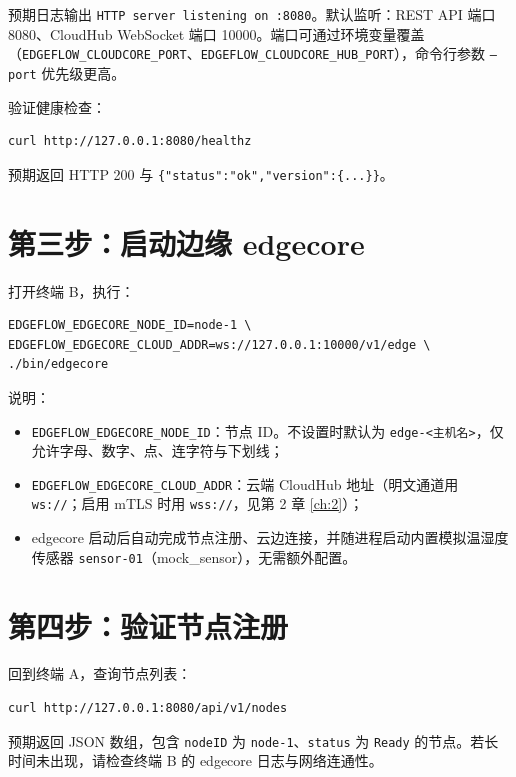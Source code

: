 预期日志输出 \texttt{HTTP server listening on :8080}。默认监听：REST API 端口 8080、CloudHub WebSocket 端口 10000。端口可通过环境变量覆盖（\texttt{EDGEFLOW\_CLOUDCORE\_PORT}、\texttt{EDGEFLOW\_CLOUDCORE\_HUB\_PORT}），命令行参数 \texttt{--port} 优先级更高。

验证健康检查：

\begin{lstlisting}
curl http://127.0.0.1:8080/healthz
\end{lstlisting}

预期返回 HTTP 200 与 \texttt{\{"status":"ok","version":\{...\}\}}。

\section{第三步：启动边缘 edgecore}

打开终端 B，执行：

\begin{lstlisting}
EDGEFLOW_EDGECORE_NODE_ID=node-1 \
EDGEFLOW_EDGECORE_CLOUD_ADDR=ws://127.0.0.1:10000/v1/edge \
./bin/edgecore
\end{lstlisting}

说明：

\begin{itemize}
  \item \texttt{EDGEFLOW\_EDGECORE\_NODE\_ID}：节点 ID。不设置时默认为 \texttt{edge-<主机名>}，仅允许字母、数字、点、连字符与下划线；
  \item \texttt{EDGEFLOW\_EDGECORE\_CLOUD\_ADDR}：云端 CloudHub 地址（明文通道用 \texttt{ws://}；启用 mTLS 时用 \texttt{wss://}，见第 2 章 \autoref{ch:2}）；
  \item edgecore 启动后自动完成节点注册、云边连接，并随进程启动内置模拟温湿度传感器 \texttt{sensor-01}（mock\_sensor），无需额外配置。
\end{itemize}

\section{第四步：验证节点注册}

回到终端 A，查询节点列表：

\begin{lstlisting}
curl http://127.0.0.1:8080/api/v1/nodes
\end{lstlisting}

预期返回 JSON 数组，包含 \texttt{nodeID} 为 \texttt{node-1}、\texttt{status} 为 \texttt{Ready} 的节点。若长时间未出现，请检查终端 B 的 edgecore 日志与网络连通性。

